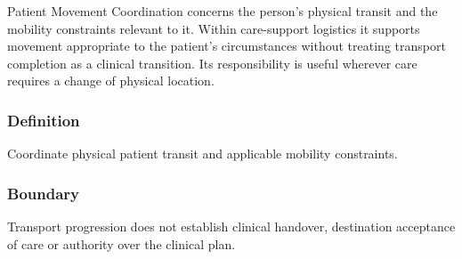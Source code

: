 Patient Movement Coordination concerns the person's physical transit and the mobility constraints relevant to it. Within care-support logistics it supports movement appropriate to the patient's circumstances without treating transport completion as a clinical transition. Its responsibility is useful wherever care requires a change of physical location.

\subsubsection*{Definition}

Coordinate physical patient transit and applicable mobility constraints.

\subsubsection*{Boundary}

Transport progression does not establish clinical handover, destination acceptance of care or authority over the clinical plan.

